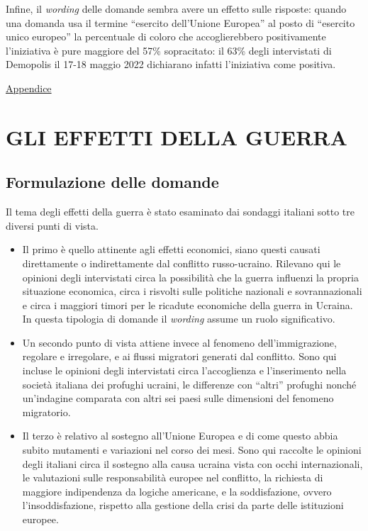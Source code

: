\documentclass[
  openany]{book}
\begin{document}
Infine, il \emph{wording} delle domande sembra avere un effetto sulle risposte: quando una domanda usa il termine ``esercito dell'Unione Europea'' al posto di ``esercito unico europeo'' la percentuale di coloro che accoglierebbero positivamente l'iniziativa è pure maggiore del 57\% sopracitato: il 63\% degli intervistati di Demopolis il 17-18 maggio 2022 dichiarano infatti l'iniziativa come positiva.

\href{https://github.com/LucianaFazio/Ucrania/blob/main/PDF_Appendice/V.\%20Cosa\%20dobbiamo\%20possiamo\%20fare\%20noi\%20v.5.pdf}{Appendice}

\hypertarget{gli-effetti-della-guerra}{%
\chapter{GLI EFFETTI DELLA GUERRA}\label{gli-effetti-della-guerra}}

\hypertarget{formulazione-delle-domande-4}{%
\section{Formulazione delle domande}\label{formulazione-delle-domande-4}}

Il tema degli effetti della guerra è stato esaminato dai sondaggi italiani sotto tre diversi punti di vista.

\begin{itemize}
\item
  Il primo è quello attinente agli effetti economici, siano questi causati direttamente o indirettamente dal conflitto russo-ucraino. Rilevano qui le opinioni degli intervistati circa la possibilità che la guerra influenzi la propria situazione economica, circa i risvolti sulle politiche nazionali e sovrannazionali e circa i maggiori timori per le ricadute economiche della guerra in Ucraina. In questa tipologia di domande il \emph{wording} assume un ruolo significativo.
\item
  Un secondo punto di vista attiene invece al fenomeno dell'immigrazione, regolare e irregolare, e ai flussi migratori generati dal conflitto. Sono qui incluse le opinioni degli intervistati circa l'accoglienza e l'inserimento nella società italiana dei profughi ucraini, le differenze con ``altri'' profughi nonché un'indagine comparata con altri sei paesi sulle dimensioni del fenomeno migratorio.
\item
  Il terzo è relativo al sostegno all'Unione Europea e di come questo abbia subito mutamenti e variazioni nel corso dei mesi. Sono qui raccolte le opinioni degli italiani circa il sostegno alla causa ucraina vista con occhi internazionali, le valutazioni sulle responsabilità europee nel conflitto, la richiesta di maggiore indipendenza da logiche americane, e la soddisfazione, ovvero l'insoddisfazione, rispetto alla gestione della crisi da parte delle istituzioni europee.
\end{itemize}
\end{document}
